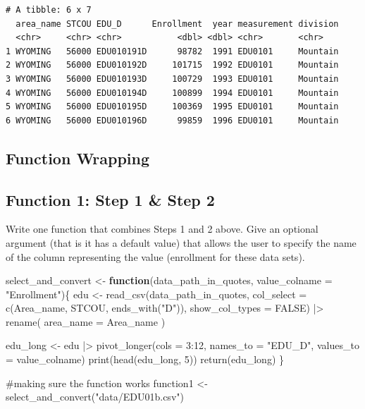 \documentclass[
  letterpaper,
  DIV=11,
  numbers=noendperiod]{scrartcl}
\newenvironment{Shaded}{\begin{snugshade}}{\end{snugshade}}
\newcommand{\AttributeTok}[1]{\textcolor[rgb]{0.40,0.45,0.13}{#1}}
\newcommand{\CommentTok}[1]{\textcolor[rgb]{0.37,0.37,0.37}{#1}}
\newcommand{\ConstantTok}[1]{\textcolor[rgb]{0.56,0.35,0.01}{#1}}
\newcommand{\ControlFlowTok}[1]{\textcolor[rgb]{0.00,0.23,0.31}{\textbf{#1}}}
\newcommand{\DecValTok}[1]{\textcolor[rgb]{0.68,0.00,0.00}{#1}}
\newcommand{\FunctionTok}[1]{\textcolor[rgb]{0.28,0.35,0.67}{#1}}
\newcommand{\NormalTok}[1]{\textcolor[rgb]{0.00,0.23,0.31}{#1}}
\newcommand{\OtherTok}[1]{\textcolor[rgb]{0.00,0.23,0.31}{#1}}
\newcommand{\SpecialCharTok}[1]{\textcolor[rgb]{0.37,0.37,0.37}{#1}}
\newcommand{\StringTok}[1]{\textcolor[rgb]{0.13,0.47,0.30}{#1}}
\begin{document}
\begin{verbatim}
# A tibble: 6 x 7
  area_name STCOU EDU_D      Enrollment  year measurement division
  <chr>     <chr> <chr>           <dbl> <dbl> <chr>       <chr>   
1 WYOMING   56000 EDU010191D      98782  1991 EDU0101     Mountain
2 WYOMING   56000 EDU010192D     101715  1992 EDU0101     Mountain
3 WYOMING   56000 EDU010193D     100729  1993 EDU0101     Mountain
4 WYOMING   56000 EDU010194D     100899  1994 EDU0101     Mountain
5 WYOMING   56000 EDU010195D     100369  1995 EDU0101     Mountain
6 WYOMING   56000 EDU010196D      99859  1996 EDU0101     Mountain
\end{verbatim}

\subsection{Function Wrapping}\label{function-wrapping}

\subsection{Function 1: Step 1 \& Step
2}\label{function-1-step-1-step-2}

Write one function that combines Steps 1 and 2 above. Give an optional
argument (that is it has a default value) that allows the user to
specify the name of the column representing the value (enrollment for
these data sets).

\begin{Shaded}
\begin{Highlighting}[]
\NormalTok{select\_and\_convert }\OtherTok{\textless{}{-}} \ControlFlowTok{function}\NormalTok{(data\_path\_in\_quotes, }\AttributeTok{value\_colname =} \StringTok{"Enrollment"}\NormalTok{)\{}
\NormalTok{  edu }\OtherTok{\textless{}{-}} \FunctionTok{read\_csv}\NormalTok{(data\_path\_in\_quotes, }
                  \AttributeTok{col\_select =} \FunctionTok{c}\NormalTok{(Area\_name, STCOU, }\FunctionTok{ends\_with}\NormalTok{(}\StringTok{"D"}\NormalTok{)), }
                  \AttributeTok{show\_col\_types =} \ConstantTok{FALSE}\NormalTok{) }\SpecialCharTok{|\textgreater{}}
  \FunctionTok{rename}\NormalTok{(}
    \AttributeTok{area\_name =}\NormalTok{ Area\_name}
\NormalTok{  )}
  
\NormalTok{  edu\_long }\OtherTok{\textless{}{-}}\NormalTok{ edu }\SpecialCharTok{|\textgreater{}}
                \FunctionTok{pivot\_longer}\NormalTok{(}\AttributeTok{cols =} \DecValTok{3}\SpecialCharTok{:}\DecValTok{12}\NormalTok{,}
                             \AttributeTok{names\_to =} \StringTok{"EDU\_D"}\NormalTok{,}
                             \AttributeTok{values\_to =}\NormalTok{ value\_colname)}
  \FunctionTok{print}\NormalTok{(}\FunctionTok{head}\NormalTok{(edu\_long, }\DecValTok{5}\NormalTok{))}
  \FunctionTok{return}\NormalTok{(edu\_long)}
\NormalTok{\}}

\CommentTok{\#making sure the function works}
\NormalTok{function1 }\OtherTok{\textless{}{-}} \FunctionTok{select\_and\_convert}\NormalTok{(}\StringTok{"data/EDU01b.csv"}\NormalTok{) }
\end{Highlighting}
\end{Shaded}
\end{document}
